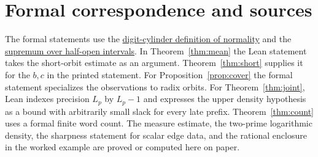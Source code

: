 \documentclass[11pt]{article}
\newcommand{\baseurl}{https://github.com/eldernos/MathematicsResearch/blob/a09e011720bc74396a27f4cb3ce2d8a5b3ce5035}
\newcommand{\src}[3]{\href{\baseurl/NormalityChecker/#1.lean\#L#2}{#3}}
\begin{document}
\section{Formal correspondence and sources}
The formal statements use the \src{Basic}{23}{digit-cylinder definition of normality} and the \src{BinaryDiscrepancy}{11}{supremum over half-open intervals}. In Theorem~\ref{thm:mean} the Lean statement takes the short-orbit estimate as an argument. Theorem~\ref{thm:short} supplies it for the \(b,c\) in the printed statement. For Proposition~\ref{prop:cover} the formal statement specializes the observations to radix orbits. For Theorem~\ref{thm:joint}, Lean indexes precision \(L_p\) by \(L_p-1\) and expresses the upper density hypothesis as a bound with arbitrarily small slack for every late prefix. Theorem~\ref{thm:count} uses a formal finite word count. The measure estimate, the two-prime logarithmic density, the sharpness statement for scalar edge data, and the rational enclosure in the worked example are proved or computed here on paper.
\end{document}
